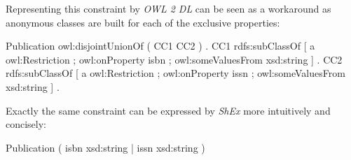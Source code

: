 \documentclass{acm_proc_article-sp}
\newcommand{\ms}[1]{%
  \texttt{#1}
}
\newenvironment{DL}{
  \vspace{0cm}
  \begin{tabular}{l l}

}{
  \end{tabular}
}
\begin{document}
Representing this constraint by \emph{OWL 2 DL} can be seen as a workaround 
as anonymous classes are built for each of the exclusive properties:
\begin{ex}
Publication owl:disjointUnionOf ( CC1 CC2 ) . 
CC1 rdfs:subClassOf [ a owl:Restriction ;
    owl:onProperty isbn ;
    owl:someValuesFrom xsd:string ] .
CC2 rdfs:subClassOf [ a owl:Restriction ;
    owl:onProperty issn ;
    owl:someValuesFrom xsd:string ] .
\end{ex}
Exactly the same constraint can be expressed by \emph{ShEx} more intuitively and concisely:
\begin{ex}
Publication { ( isbn xsd:string | issn xsd:string ) }
\end{ex}

%
%
%
%
%
%
\end{document}
